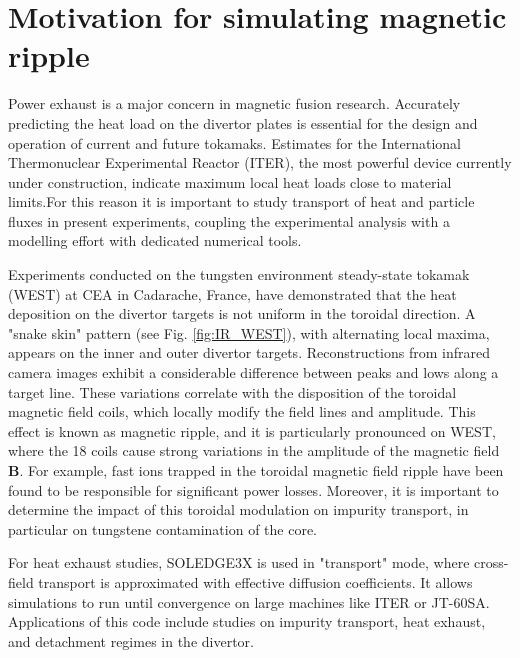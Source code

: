 \section{Motivation for simulating magnetic ripple}
\label{sec:ripple_intro}

Power exhaust is a major concern in magnetic fusion research. Accurately predicting the heat load on the divertor plates is essential for the design and operation of current and future tokamaks. Estimates for the International Thermonuclear Experimental Reactor (ITER), the most powerful device currently under construction, indicate maximum local heat loads close to material limits\cite{gunn2017surface}.For this reason it is important to study transport of heat and particle fluxes in present experiments, coupling the experimental analysis with a modelling effort  with dedicated numerical tools. \newline

Experiments conducted on the tungsten environment steady-state tokamak (WEST) at CEA in Cadarache, France\cite{bucalossi2022}, have demonstrated that the heat deposition on the divertor targets is not uniform in the toroidal direction. A "snake skin" pattern (see Fig. \ref{fig:IR_WEST}), with alternating local maxima, appears on the inner and outer divertor targets. Reconstructions from infrared camera images exhibit a considerable difference between peaks and lows along a target line. These variations correlate with the disposition of the toroidal magnetic field coils, which locally modify the field lines and amplitude. This effect is known as magnetic ripple\cite{tani1981effect}, and it is particularly pronounced on WEST, where the 18 coils cause strong variations in the amplitude of the magnetic field $\textbf{B}$. For example, fast ions trapped in the toroidal magnetic field ripple have been found to be responsible for significant power losses\cite{moiraf2023optimization}. Moreover, it is important to determine the impact of this toroidal modulation on impurity transport, in particular on tungstene contamination of the core\cite{diGenova2021modelling}. \newline

For heat exhaust studies, SOLEDGE3X is used in "transport" mode, where cross-field transport is approximated with effective diffusion coefficients. It allows simulations to run until convergence on large machines like ITER\cite{rivals2022soledge3x} or JT-60SA\cite{deGianni2024}. Applications of this code include studies on impurity transport\cite{Ciraolo2021}, heat exhaust\cite{rivals2022impact}, and detachment regimes in the divertor\cite{yang2023control}. \newline


